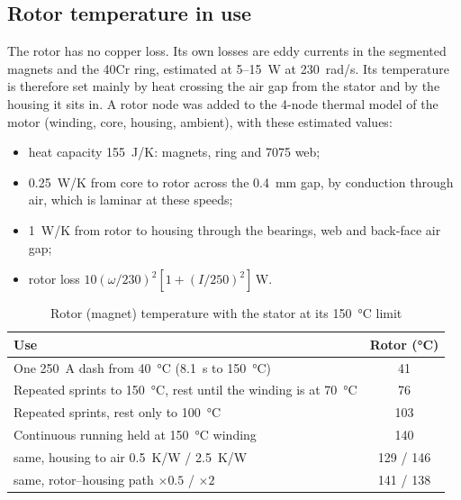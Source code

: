 \subsection{Rotor temperature in use}
The rotor has no copper loss. Its own losses are eddy currents in the segmented magnets and the 40Cr ring, estimated at 5--\SI{15}{W} at \SI{230}{rad/s}. Its temperature is therefore set mainly by heat crossing the air gap from the stator and by the housing it sits in. A rotor node was added to the 4-node thermal model of the motor (winding, core, housing, ambient), with these estimated values:
\begin{itemize}
\item heat capacity \SI{155}{J/K}: magnets, ring and 7075 web;
\item \SI{0.25}{W/K} from core to rotor across the \SI{0.4}{mm} gap, by conduction through air, which is laminar at these speeds;
\item \SI{1}{W/K} from rotor to housing through the bearings, web and back-face air gap;
\item rotor loss $10(\omega/230)^2[1+(I/250)^2]$\,W.
\end{itemize}

\begin{table}[!t]
\caption{Rotor (magnet) temperature with the stator at its \SI{150}{\celsius} limit}\label{tab:rotorT}
\centering\footnotesize
\begin{tabular}{@{}p{50mm}c@{}}
\toprule
Use & Rotor (\si{\celsius})\\
\midrule
One \SI{250}{A} dash from \SI{40}{\celsius} (\SI{8.1}{s} to \SI{150}{\celsius}) & 41\\
Repeated sprints to \SI{150}{\celsius}, rest until the winding is at \SI{70}{\celsius} & 76\\
Repeated sprints, rest only to \SI{100}{\celsius} & 103\\
Continuous running held at \SI{150}{\celsius} winding & 140\\
\quad same, housing to air \SI{0.5}{K/W} / \SI{2.5}{K/W} & 129 / 146\\
\quad same, rotor--housing path $\times0.5$ / $\times2$ & 141 / 138\\
\bottomrule
\end{tabular}
\end{table}



